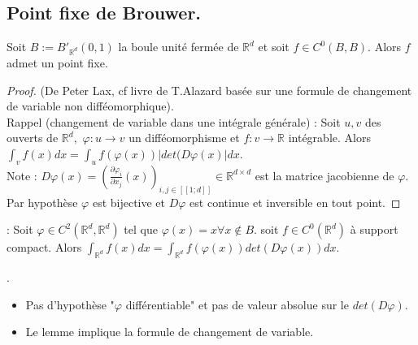 \subsection{Point fixe de Brouwer.}
\begin{theoreme}
\hypertarget{brouwer}{
    Soit $B:=B'_{\mathbb{R} ^d}(0,1)$ la boule unité fermée de $\mathbb{R} ^d$ et soit $f\in C^0(B,B).$ Alors $f$ admet un point fixe.}
\end{theoreme}
\begin{proof}
    (De Peter Lax, cf livre de T.Alazard basée sur une formule de changement de variable non difféomorphique).\\
    Rappel (changement de variable dans une intégrale générale) : Soit $u,v$ des ouverts de $\mathbb{R} ^d,$ $\varphi :u\to v$ un difféomorphisme et $f:v\to \mathbb{R} $ intégrable. Alors $\int_vf(x)dx=\int_uf(\varphi (x))|det(D\varphi (x)|dx. $\\
    Note : $D\varphi (x)=\left( \frac{\partial \varphi _i}{\partial x_j}(x) \right)_{i,j\in [\![1;d]\!]}\in \mathbb{R} ^{d\times d} $ est la matrice jacobienne de $\varphi .$ \\
    Par hypothèse $\varphi $ est bijective et $D\varphi $ est continue et inversible en tout point.
\end{proof}
    \begin{lemme}
         : Soit $\varphi \in C^2(\mathbb{R} ^d,\mathbb{R} ^d)$ tel que $\varphi (x)=x\forall x\not\in B.$ soit $f\in C^0(\mathbb{R} ^d)$ à support compact. Alors $\int_{\mathbb{R} ^d}f(x)dx=\int_{\mathbb{R} ^d}f(\varphi (x))det(D\varphi (x))dx.$
    \end{lemme}
    \begin{remarque}
        .
        \begin{itemize}
            \item Pas d'hypothèse "$\varphi$ différentiable" et pas de valeur absolue sur le $det(D\varphi )$.
            \item Le lemme implique la formule de changement de variable.
        \end{itemize}
    \end{remarque}

